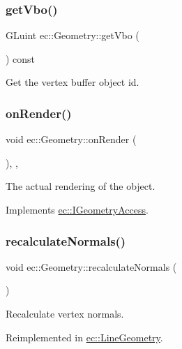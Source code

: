 \subsubsection{\texorpdfstring{get\+Vbo()}{getVbo()}}
{\footnotesize\ttfamily G\+Luint ec\+::\+Geometry\+::get\+Vbo (\begin{DoxyParamCaption}{ }\end{DoxyParamCaption}) const}

Get the vertex buffer object id. \mbox{\label{classec_1_1_geometry_a1f166e70fc880e88092f29ef46afb836}} 
\subsubsection{\texorpdfstring{on\+Render()}{onRender()}}
{\footnotesize\ttfamily void ec\+::\+Geometry\+::on\+Render (\begin{DoxyParamCaption}{ }\end{DoxyParamCaption})\hspace{0.3cm}{\ttfamily [override]}, {\ttfamily [protected]}, {\ttfamily [virtual]}}

The actual rendering of the object. 

Implements \mbox{\hyperlink{classec_1_1_i_geometry_access_a2ee418c9fa4eb266347bae2f0ef8095b}{ec\+::\+I\+Geometry\+Access}}.

\mbox{\label{classec_1_1_geometry_a228d4a0fa01a17379f24aee2c769b501}} 
\subsubsection{\texorpdfstring{recalculate\+Normals()}{recalculateNormals()}}
{\footnotesize\ttfamily void ec\+::\+Geometry\+::recalculate\+Normals (\begin{DoxyParamCaption}{ }\end{DoxyParamCaption})\hspace{0.3cm}{\ttfamily [virtual]}}

Recalculate vertex normals. 

Reimplemented in \mbox{\hyperlink{classec_1_1_line_geometry_a7a0b22930aa566c97d5f86f2a8246696}{ec\+::\+Line\+Geometry}}.

